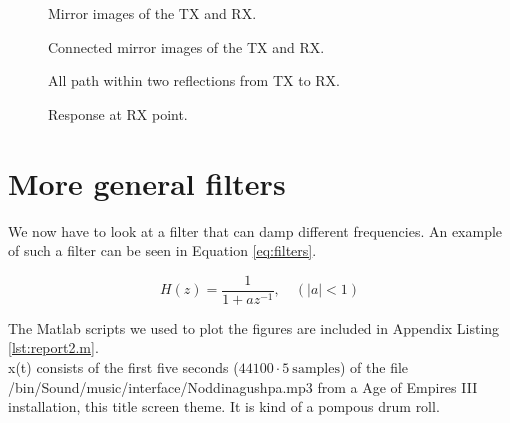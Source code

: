 \documentclass[final]{scrreprt} %
\begin{document}
\begin{figure}[H]
	\centering
	\setlength\figureheight{6cm}
    	\setlength\figurewidth{6cm}
	
	\caption{Mirror images of the TX and RX.}
	\label{fig:mirror}
\end{figure}

\begin{figure}[H]
	\centering
	\setlength\figureheight{6cm}
    	\setlength\figurewidth{6cm}
	
	\caption{Connected mirror images of the TX and RX.}
	\label{fig:connected}
\end{figure}

\begin{figure}[H]
	\centering
	\setlength\figureheight{6cm}
    	\setlength\figurewidth{6cm}
	
	\caption{All path within two reflections from TX to RX.}
	\label{fig:reflections}
\end{figure}

\begin{figure}[H]
	\centering
	\setlength\figureheight{4cm}
    	\setlength{}
	
	\caption{Response at RX point.}
	\label{fig:response}
\end{figure}

\section{More general filters}
We now have to look at a filter that can damp different frequencies. 
An example of such a filter can be seen in Equation \ref{eq:filters}.

\begin{equation}
H(z) = \dfrac{1}{1 + az^{-1}}, \quad (|a| < 1)
\label{eq:filters}
\end{equation}

The Matlab scripts we used to plot the figures are included in Appendix Listing \ref{lst:report2.m}.
\\
x(t) consists of the first five seconds ($44100\cdot5 ~\mathrm{samples}$) of the file /bin/Sound/music/interface/Noddinagushpa.mp3 from a Age of Empires III installation, this title screen theme.
It is kind of a pompous drum roll.
\\
\\
\end{document}
